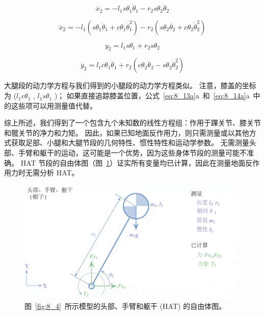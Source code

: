 \begin{equation}
	\dot{x}_2 = 
		- l_1 s \theta_1 \dot{\theta}_1
		- r_2 s \theta_2  \dot{\theta}_2
	\label{eq:8_13b}
\end{equation}


\begin{equation}
	\ddot{x}_2 = 
		- l_1 ( s \theta_1 \ddot{\theta}_1  +  c \theta_1 \dot{\theta}_1^2)
		- r_2 ( s \theta_2 \ddot{\theta_2}  +  c \theta_2 \dot{\theta}_2^2 )
	\label{eq:8_13c}
\end{equation}


\begin{equation}
	y_2 = l_1 s \theta_1  +  r_2 s \theta_2
	\label{eq:8_14a}
\end{equation}


\begin{equation}
	\dot{y}_2  = l_1 c \theta_1  \dot{\theta}_1 
	+ r_2 ( c  \theta_2  \ddot{\theta}_2  -  s \theta_2 \dot{\theta}_2^2)
	\label{eq:8_14c}
\end{equation}


大腿段的动力学方程与我们得到的小腿段的动力学方程类似。
注意，膝盖的坐标为 ($l_1 c \theta_1$ , $l_1 s \theta_1$ )；
如果直接追踪膝盖位置，公式~\ref{eq:8_13a}a~和~\ref{eq:8_14a}a~中的这些项可以用测量值代替。


综上所述，我们得到了一个包含九个未知数的线性方程组：作用于踝关节、膝关节和髋关节的净力和力矩。
因此，如果已知地面反作用力，则只需测量或以其他方式获取足部、小腿和大腿节段的几何特性、惯性特性和运动学参数。
无需测量头部、手臂和躯干的运动，这可能是一个优势，因为这些身体节段的测量可能不准确。
HAT 节段的自由体图（图~\ref{fig:8_8}）证实所有变量均已计算，因此在测量地面反作用力时无需分析 HAT。


\begin{figure}[!htb]
	\centering
	\includegraphics[width=0.85\linewidth]{chap8/8_8}
	\caption{图~\ref{fig:8_4}~所示模型的头部、手臂和躯干 (HAT) 的自由体图。 \label{fig:8_8}}
\end{figure}



